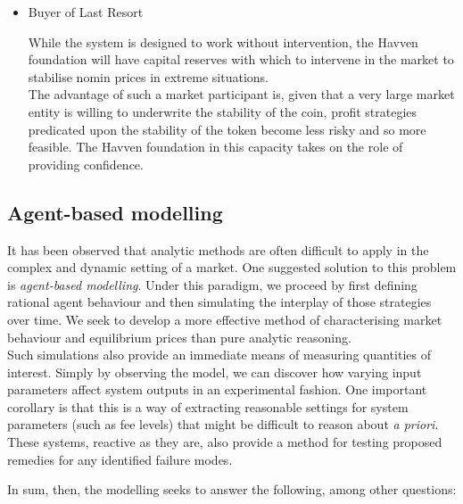 \begin{itemize}

	\item{Buyer of Last Resort}
	
	While the system is designed to work without intervention, the Havven foundation
	will have capital reserves with which to intervene in the market to stabilise
	nomin prices in extreme situations. \\
	The advantage of such a market participant is, given that a very large market entity is
	willing to underwrite the stability of the coin, profit strategies predicated upon the
	stability of the token become less risky and so more feasible. The Havven foundation in
	this capacity takes on the role of providing confidence.

\end{itemize}

\subsection{Agent-based modelling}
It has been observed that analytic methods are often difficult to
apply in the complex and dynamic setting of a market.
One suggested solution to this problem is \textit{agent-based modelling}.
Under this paradigm, we proceed by first defining rational agent behaviour
and then simulating the interplay of those strategies over time.
We seek to develop a more effective
method of characterising market behaviour and equilibrium prices than pure analytic reasoning.~\cite{poggio2001agent}\\

\noindent Such simulations also provide an immediate means of measuring
quantities of interest. Simply by observing
the model, we can discover how varying input parameters
affect system outputs in an experimental fashion.
One important corollary is that this is a way of extracting reasonable
settings for system parameters (such as fee levels) that might be difficult
to reason about \textit{a priori}. These systems, reactive as they are,
also provide a method for testing proposed remedies for any identified failure
modes.


\noindent In sum, then, the modelling seeks to answer the following, among other questions:

